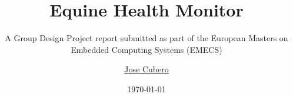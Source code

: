 
\newcommand{\mytitle}{Equine Health Monitor}
\newcommand{\mysubtitle}{A Group Design Project report submitted as part of the European Masters on Embedded Computing Systems (EMECS)}
\newcommand{\myauthor}{ 
{\texorpdfstring{\href{mailto:jacc1g12@soton.ac.uk}{Jose Cubero}}{Jose Cubero}} 
}
\newcommand{\myauthori}{
\texorpdfstring{\href{mailto:mo1g12@soton.ac.uk}{Merve Oksar}}{Merve Oksar}
}
\newcommand{\myauthorii}{
\texorpdfstring{\href{mailto:kr2g12@soton.ac.uk}{Konke Radlow}}{Konke Radlow}
}
\newcommand{\myauthoriii}{
\texorpdfstring{\href{mailto:ms15g12@soton.ac.uk}{Michail Sidorov}}{Michail Sidorov}
}
\newcommand{\myauthoriv}{
 \texorpdfstring{\href{mailto:yu1g12@soton.ac.uk}{Yaman Umuroglu}}{Yaman Umuroglu}
}
\newcommand{\type}{GDP Project 2012/2013}
\newcommand{\fieldOfStudy}{EMECS}
\newcommand{\professor}{Dr. Peter Reid Wilson}
\newcommand{\professori}{Iain McNelly}
\newcommand{\location}{Southampton}
\newcommand{\semester}{Winter 2012}

\newcommand{\UNIVERSITY}{
\texorpdfstring{\href{http://www.soton.ac.uk}
{UNIVERSITY OF SOUTHAMPTON}}
{UNIVERSITY OF SOUTHAMPTON}}

\newcommand{\faculty}{
\texorpdfstring{\href{http://www.engineering.soton.ac.uk}
{Faculty of Engineering, Science and Mathematics}}
{Faculty of Engineering, Science and Mathematics}}


\title{\mytitle}
\subtitle{\mysubtitle}
\author{\myauthor}
\date{\today}



